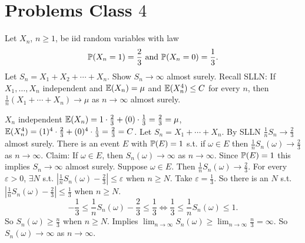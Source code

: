 \documentclass[10pt, a4paper]{article}
\begin{document}
\newpage

\section{Problems Class \texorpdfstring{$4$}{}}

\begin{problem}
    Let $X_n$,
    $n \geq 1$,
    be iid random variables with law
    \[
    \P(X_n = 1) = \frac{2}{3}\text{ and } \P(X_n = 0) = \frac{1}{3}.
    \]
    Let $S_n = X_1 + X_2 + \dotsi + X_n$.
    Show $S_n \to \infty$ almost surely.
    Recall SLLN:
    If $X_1, \dotsc, X_n$ independent and $\E(X_n) = \mu$ and $\E(X_n ^ 4) \leq C$ for every $n$,
    then $\frac{1}{n}(X_1 + \dotsi + X_n) \to \mu$ as $n \to \infty$ almost surely.

    \begin{solution}
        $X_n$ independent $\E(X_n) = 1\cdot\frac{2}{3} + (0)\cdot \frac{1}{3} = \frac{2}{3} = \mu$,
        $\E(X_n ^ 4) = (1) ^ 4\cdot\frac{2}{3} + (0) ^ 4\cdot \frac{1}{3} = \frac{2}{3} = C$.
        Let $S_n = X_1 + \dotsi + X_n$.
        By SLLN $\frac{1}{n}S_n \to \frac{2}{3}$ almost surely.
        There is an event $E$ with $\P(E) = 1$ s.t. if $\omega \in E$ then $\frac{1}{n}S_n(\omega) \to \frac{2}{3}$ as $n \to \infty$.
        Claim:
        If $\omega \in E$,
        then $S_n(\omega) \to \infty$ as $n \to \infty$.
        Since $\P(E) = 1$ this implies $S_n \to \infty$ almost surely.
        Suppose $\omega \in E$.
        Then $\frac{1}{n}S_n(\omega) \to \frac{2}{3}$.
        For every $\varepsilon > 0$,
        $\exists N$ s.t. $\left|\frac{1}{n}S_n(\omega) - \frac{2}{3}\right| \leq \varepsilon$ when $n \geq N$.
        Take $\varepsilon = \frac{1}{3}$.
        So there is an $N$ s.t. $\left|\frac{1}{n}S_n(\omega) - \frac{2}{3}\right| \leq \frac{1}{3}$ when $n \geq N$.
        \[
        -\frac{1}{3} \leq \frac{1}{n}S_n(\omega) - \frac{2}{3} \leq \frac{1}{3} \iff \frac{1}{3} \leq \frac{1}{n}S_n(\omega) \leq 1.
        \]
        So $S_n(\omega) \geq \frac{n}{3}$ when $n \geq N$.
        Implies $\lim_{n \to \infty}S_n(\omega) \geq \lim_{n \to \infty}\frac{n}{3} = \infty$.
        So $S_n(\omega) \to \infty$ as $n \to \infty$.
    \end{solution}
\end{problem}
\end{document}

